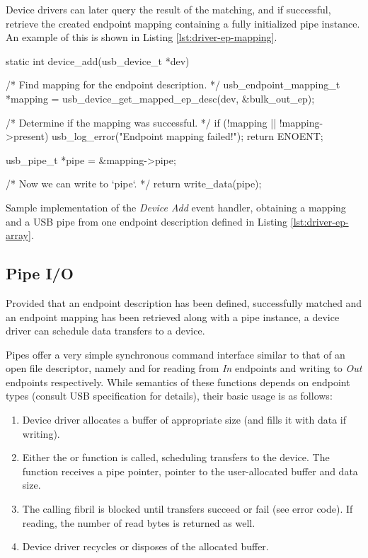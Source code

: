 Device drivers can later query the result of the matching, and if successful,
retrieve the created endpoint mapping containing a fully initialized pipe
instance. An example of this is shown in Listing \ref{lst:driver-ep-mapping}.

\begin{listing}
	\begin{code}
		static int device_add(usb_device_t *dev)
		{
			/* Find mapping for the endpoint description. */
			usb_endpoint_mapping_t *mapping = usb_device_get_mapped_ep_desc(dev, &bulk_out_ep);

			/* Determine if the mapping was successful. */
			if (!mapping || !mapping->present) {
				usb_log_error("Endpoint mapping failed!");
				return ENOENT;
			}

			usb_pipe_t *pipe = &mapping->pipe;

			/* Now we can write to `pipe`. */
			return write_data(pipe);
		}
	\end{code}
	\caption[Obtaining USB pipe from an endpoint description.]{Sample
	implementation of the \textit{Device Add} event handler, obtaining a mapping
	and a USB pipe from one endpoint description defined in Listing
	\ref{lst:driver-ep-array}.}
	\label{lst:driver-ep-mapping}
\end{listing}

\subsection{Pipe I/O}

Provided that an endpoint description has been defined, successfully matched
and an endpoint mapping has been retrieved along with a pipe instance, a device
driver can schedule data transfers to a device.

Pipes offer a very simple synchronous command interface similar to that of an
open file descriptor, namely  and  for
reading from \textit{In} endpoints and writing to \textit{Out} endpoints
respectively. While semantics of these functions depends on endpoint types
(consult USB specification for details), their basic usage is as follows:
%
\begin{enumerate}
	\item Device driver allocates a buffer of appropriate size (and fills it
		with data if writing).
	\item Either the  or  function is
		called, scheduling transfers to the device. The function receives a pipe
		pointer, pointer to the user-allocated buffer and data size.
	\item The calling fibril is blocked until transfers succeed or fail (see
		error code). If reading, the number of read bytes is returned as well.
	\item Device driver recycles or disposes of the allocated buffer.
\end{enumerate}


